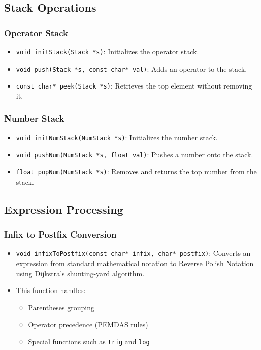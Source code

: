 \documentclass[a4paper,12pt]{article}
\theoremstyle{remark}
\begin{document}
\subsection{Stack Operations}
\subsubsection{Operator Stack}
\begin{itemize}
    \item \texttt{void initStack(Stack *s)}: Initializes the operator stack.  
    \item \texttt{void push(Stack *s, const char* val)}: Adds an operator to the stack.  
    \item \texttt{const char* peek(Stack *s)}: Retrieves the top element without removing it.  
\end{itemize}

\subsubsection{Number Stack}
\begin{itemize}
    \item \texttt{void initNumStack(NumStack *s)}: Initializes the number stack.  
    \item \texttt{void pushNum(NumStack *s, float val)}: Pushes a number onto the stack.  
    \item \texttt{float popNum(NumStack *s)}: Removes and returns the top number from the stack.  
\end{itemize}

\subsection{Expression Processing}
\subsubsection{Infix to Postfix Conversion}
\begin{itemize}
    \item \texttt{void infixToPostfix(const char* infix, char* postfix)}: Converts an expression from standard mathematical notation to Reverse Polish Notation using Dijkstra's shunting-yard algorithm.  
    \item This function handles:
    \begin{itemize}
        \item Parentheses grouping  
        \item Operator precedence (PEMDAS rules)  
        \item Special functions such as \texttt{trig} and \texttt{log}  
    \end{itemize}
\end{itemize}
\end{document}
